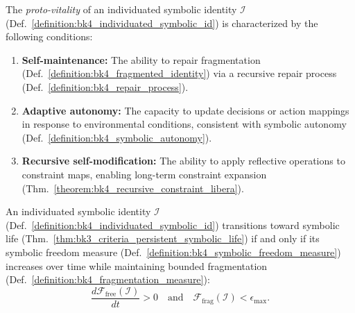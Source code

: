 \begin{definition} 
\label{definition:bk4_proto_vitality}
The \emph{proto-vitality} of an individuated symbolic identity $\mathcal{I}$ (Def.~\ref{definition:bk4_individuated_symbolic_id}) is characterized by the following conditions:
\begin{enumerate}
    \item \textbf{Self-maintenance:} The ability to repair fragmentation (Def.~\ref{definition:bk4_fragmented_identity}) via a recursive repair process (Def.~\ref{definition:bk4_repair_process}).
    \item \textbf{Adaptive autonomy:} The capacity to update decisions or action mappings in response to environmental conditions, consistent with symbolic autonomy (Def.~\ref{definition:bk4_symbolic_autonomy}).
    \item \textbf{Recursive self-modification:} The ability to apply reflective operations to constraint maps, enabling long-term constraint expansion (Thm.~\ref{theorem:bk4_recursive_constraint_libera}).
\end{enumerate}
\end{definition}

\begin{theorem} 
\label{theorem:bk4_freedom_life_connection}
An individuated symbolic identity $\mathcal{I}$ (Def.~\ref{definition:bk4_individuated_symbolic_id}) transitions toward symbolic life (Thm.~\ref{thm:bk3_criteria_persistent_symbolic_life}) if and only if its symbolic freedom measure (Def.~\ref{definition:bk4_symbolic_freedom_measure}) increases over time while maintaining bounded fragmentation (Def.~\ref{definition:bk4_fragmentation_measure}):
\begin{equation}
    \frac{d\mathcal{F}_{\text{free}}(\mathcal{I})}{dt} > 0 
    \quad \text{and} \quad 
    \mathcal{F}_{\text{frag}}(\mathcal{I}) < \epsilon_{\text{max}}.
\end{equation}
\end{theorem}

